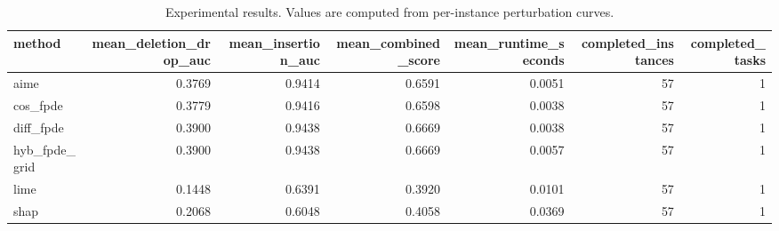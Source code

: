 \begin{table}[t]
\caption{Experimental results. Values are computed from per-instance perturbation curves.}
\label{tab:main_results_computed}
\centering
\begin{tabular}{lrrrrrr}
\toprule
method & mean\_deletion\_drop\_auc & mean\_insertion\_auc & mean\_combined\_score & mean\_runtime\_seconds & completed\_instances & completed\_tasks \\
\midrule
aime & 0.3769 & 0.9414 & 0.6591 & 0.0051 & 57 & 1 \\
cos\_fpde & 0.3779 & 0.9416 & 0.6598 & 0.0038 & 57 & 1 \\
diff\_fpde & 0.3900 & 0.9438 & 0.6669 & 0.0038 & 57 & 1 \\
hyb\_fpde\_grid & 0.3900 & 0.9438 & 0.6669 & 0.0057 & 57 & 1 \\
lime & 0.1448 & 0.6391 & 0.3920 & 0.0101 & 57 & 1 \\
shap & 0.2068 & 0.6048 & 0.4058 & 0.0369 & 57 & 1 \\
\bottomrule
\end{tabular}

\end{table}
